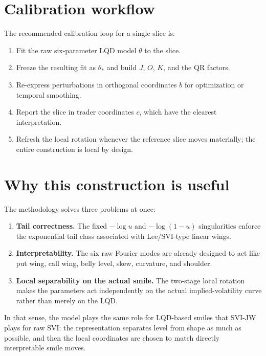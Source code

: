 \documentclass[11pt]{article}
\begin{document}
\section{Calibration workflow}
The recommended calibration loop for a single slice is:
\begin{enumerate}[leftmargin=1.9em]
\item Fit the raw six-parameter LQD model $\theta$ to the slice.
\item Freeze the resulting fit as $\theta_*$ and build $J$, $O$, $K$, and the QR factors.
\item Re-express perturbations in orthogonal coordinates $b$ for optimization or temporal smoothing.
\item Report the slice in trader coordinates $c$, which have the clearest interpretation.
\item Refresh the local rotation whenever the reference slice moves materially; the entire construction is local by design.
\end{enumerate}

\section{Why this construction is useful}
The methodology solves three problems at once:
\begin{enumerate}[leftmargin=1.9em]
\item \textbf{Tail correctness.} The fixed $-\log u$ and $-\log(1-u)$ singularities enforce the exponential tail class associated with Lee/SVI-type linear wings.
\item \textbf{Interpretability.} The six raw Fourier modes are already designed to act like put wing, call wing, belly level, skew, curvature, and shoulder.
\item \textbf{Local separability on the actual smile.} The two-stage local rotation makes the parameters act independently on the actual implied-volatility curve rather than merely on the LQD.
\end{enumerate}
In that sense, the model plays the same role for LQD-based smiles that SVI-JW plays for raw SVI: the representation separates level from shape as much as possible, and then the local coordinates are chosen to match directly interpretable smile moves.

\appendix
\end{document}
